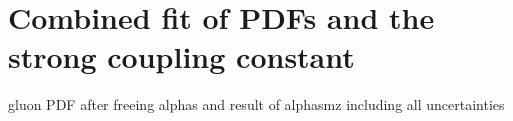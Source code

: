 \section{Combined fit of PDFs and the strong coupling constant}
gluon PDF after freeing alphas
and result of alphasmz including all uncertainties


%
%
%
%

